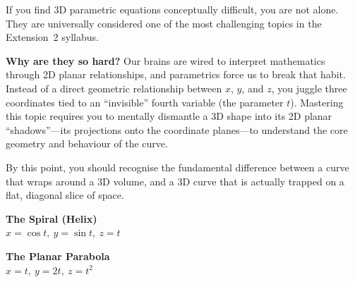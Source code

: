 \begin{remark}
If you find 3D parametric equations conceptually difficult, you are not alone. They are universally considered one of the most challenging topics in the Extension~2 syllabus.

\textbf{Why are they so hard?} Our brains are wired to interpret mathematics through 2D planar relationships, and parametrics force us to break that habit. Instead of a direct geometric relationship between $x$, $y$, and $z$, you juggle three coordinates tied to an ``invisible'' fourth variable (the parameter $t$). Mastering this topic requires you to mentally dismantle a 3D shape into its 2D planar ``shadows''---its projections onto the coordinate planes---to understand the core geometry and behaviour of the curve.

By this point, you should recognise the fundamental difference between a curve that wraps around a 3D volume, and a 3D curve that is actually trapped on a flat, diagonal slice of space.

\vspace{0.4em}
\begin{center}
\begin{minipage}{0.45\textwidth}
    \centering

    \vspace{0.2cm}
    \textbf{The Spiral (Helix)} \\
    $x = \cos t,\ y = \sin t,\ z = t$
\end{minipage}
\hfill
\begin{minipage}{0.45\textwidth}
    \centering

    \vspace{0.2cm}
    \textbf{The Planar Parabola} \\
    $x = t,\ y = 2t,\ z = t^2$
\end{minipage}
\end{center}
\end{remark}

\newpage
